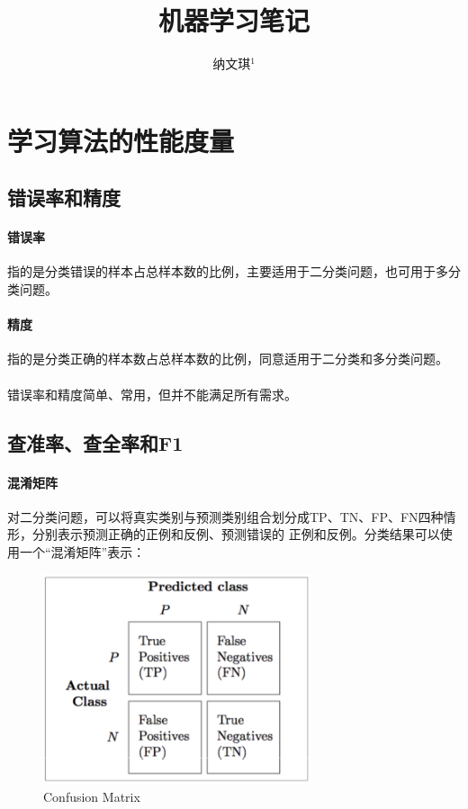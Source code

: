 \documentclass[10pt,letterpaper]{article}
\begin{document}
 


\title{机器学习笔记}

\author{纳文琪$^{1}$}

\maketitle


\section{学习算法的性能度量\cite{2016机器学习}}
\subsection{错误率和精度}
\paragraph{错误率} 指的是分类错误的样本占总样本数的比例，主要适用于二分类问题，也可用于多分类问题。
\paragraph{精度} 指的是分类正确的样本数占总样本数的比例，同意适用于二分类和多分类问题。
\paragraph{} 错误率和精度简单、常用，但并不能满足所有需求。

\subsection{查准率、查全率和F1}
\paragraph{混淆矩阵} 对二分类问题，可以将真实类别与预测类别组合划分成TP、TN、FP、FN四种情形，分别表示预测正确的正例和反例、预测错误的
正例和反例。分类结果可以使用一个“混淆矩阵”表示：\\
\begin{figure}[H] %
	\centering %
	\includegraphics[width=0.7\textwidth]{../images/confusion_matrix.png} %
	\caption{Confusion Matrix} %
	\label{Fig.main2} %
\end{figure}
\end{document}
